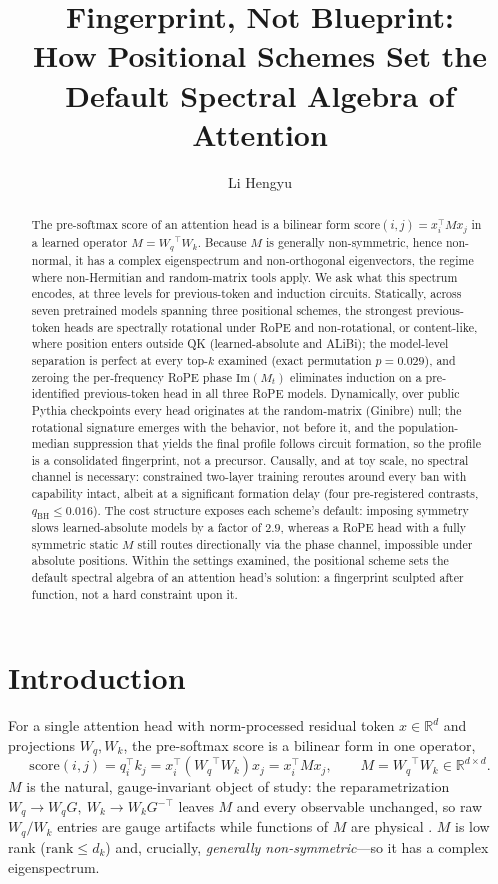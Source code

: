 \documentclass[11pt]{article}
\title{\textbf{Fingerprint, Not Blueprint:\\
How Positional Schemes Set the Default Spectral Algebra of Attention}}
\author[1]{Li Hengyu}
\affil[1]{Institute for Solid State Physics, The University of Tokyo\\
\texttt{lihengyu@issp.u-tokyo.ac.jp}}
\date{}
\newcommand{\M}{\ensuremath{M}\xspace}
\newcommand{\Mt}{\ensuremath{M_t}\xspace}
\newcommand{\Wq}{\ensuremath{W_q}}
\newcommand{\Wk}{\ensuremath{W_k}}
\newcommand{\Rope}{RoPE\xspace}
\begin{document}
\maketitle

\begin{abstract}
The pre-softmax score of an attention head is a bilinear form $\mathrm{score}(i,j)=x_i^\top \M x_j$ in a learned
operator $\M = \Wq^\top \Wk$. Because \M is generally non-symmetric, hence non-normal, it has a complex
eigenspectrum and non-orthogonal eigenvectors, the regime where non-Hermitian and random-matrix tools apply. We ask
what this spectrum encodes, at three levels for previous-token and induction circuits. Statically, across seven
pretrained models spanning three positional schemes, the strongest previous-token heads are spectrally rotational
under \Rope and non-rotational, or content-like, where position enters outside QK (learned-absolute and ALiBi); the
model-level separation is perfect at every top-$k$ examined (exact permutation $p{=}0.029$), and zeroing the
per-frequency \Rope phase $\mathrm{Im}(\Mt)$ eliminates induction on a pre-identified previous-token head in all
three \Rope models. Dynamically, over public Pythia checkpoints every head originates at the random-matrix
(Ginibre) null; the rotational signature emerges with the behavior, not before it, and the population-median
suppression that yields the final profile follows circuit formation, so the profile is a consolidated fingerprint,
not a precursor. Causally, and at toy scale, no spectral channel is necessary: constrained two-layer training
reroutes around every ban with capability intact, albeit at a significant formation delay (four pre-registered
contrasts, $q_{\mathrm{BH}}{\le}0.016$). The cost structure exposes each scheme's default: imposing symmetry slows
learned-absolute models by a factor of $2.9$, whereas a \Rope head with a fully symmetric static \M still routes
directionally via the phase channel, impossible under absolute positions. Within the settings examined, the
positional scheme sets the default spectral algebra of an attention head's solution: a fingerprint sculpted after
function, not a hard constraint upon it.
\end{abstract}

\section{Introduction}
For a single attention head with norm-processed residual token $x\in\mathbb{R}^d$ and projections $\Wq,\Wk$, the
pre-softmax score is a bilinear form in one operator,
\begin{equation}
\mathrm{score}(i,j) = q_i^\top k_j = x_i^\top(\Wq^\top \Wk)x_j = x_i^\top \M x_j,\qquad \M=\Wq^\top \Wk \in\mathbb{R}^{d\times d}.
\end{equation}
\M is the natural, gauge-invariant object of study: the reparametrization $\Wq\!\to\!\Wq G,\ \Wk\!\to\!\Wk G^{-\top}$
leaves \M and every observable unchanged, so raw $\Wq/\Wk$ entries are gauge artifacts while functions of \M are
physical \citep{elhage2021framework}. \M is low rank ($\mathrm{rank}\le d_k$) and, crucially, \emph{generally
non-symmetric}---so it has a complex eigenspectrum.
\end{document}
